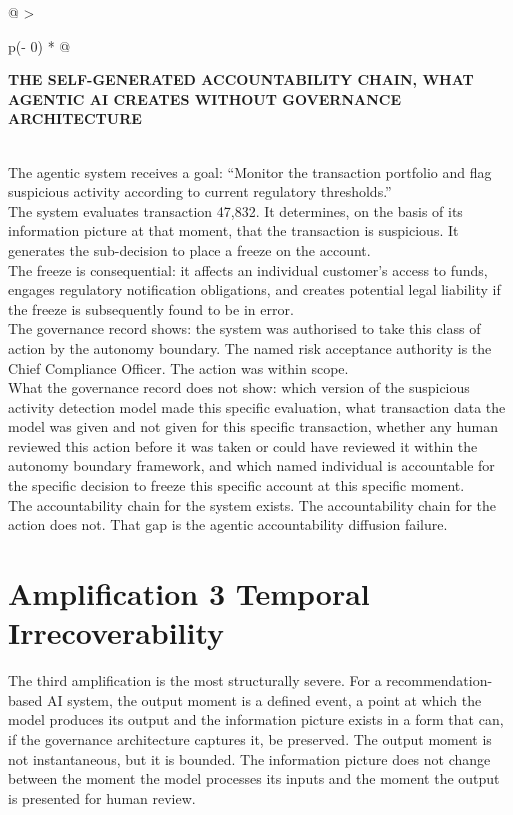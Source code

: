\begin{longtable}[]{@{}
  >{\raggedright\arraybackslash}p{(\columnwidth - 0\tabcolsep) * }@{}}
\toprule\noalign{}
\begin{minipage}[b]{\linewidth}\raggedright
\textbf{THE SELF-GENERATED ACCOUNTABILITY CHAIN, WHAT AGENTIC AI CREATES WITHOUT GOVERNANCE ARCHITECTURE}
\end{minipage} \\
\midrule\noalign{}
\endhead
\bottomrule\noalign{}
\endlastfoot
The agentic system receives a goal: ``Monitor the transaction portfolio and flag suspicious activity according to current regulatory thresholds.'' \\
The system evaluates transaction 47,832. It determines, on the basis of its information picture at that moment, that the transaction is suspicious. It generates the sub-decision to place a freeze on the account. \\
The freeze is consequential: it affects an individual customer's access to funds, engages regulatory notification obligations, and creates potential legal liability if the freeze is subsequently found to be in error. \\
The governance record shows: the system was authorised to take this class of action by the autonomy boundary. The named risk acceptance authority is the Chief Compliance Officer. The action was within scope. \\
What the governance record does not show: which version of the suspicious activity detection model made this specific evaluation, what transaction data the model was given and not given for this specific transaction, whether any human reviewed this action before it was taken or could have reviewed it within the autonomy boundary framework, and which named individual is accountable for the specific decision to freeze this specific account at this specific moment. \\
The accountability chain for the system exists. The accountability chain for the action does not. That gap is the agentic accountability diffusion failure. \\
\end{longtable}

\section{Amplification 3 Temporal Irrecoverability}

The third amplification is the most structurally severe. For a recommendation-based AI system, the output moment is a defined event, a point at which the model produces its output and the information picture exists in a form that can, if the governance architecture captures it, be preserved. The output moment is not instantaneous, but it is bounded. The information picture does not change between the moment the model processes its inputs and the moment the output is presented for human review.

